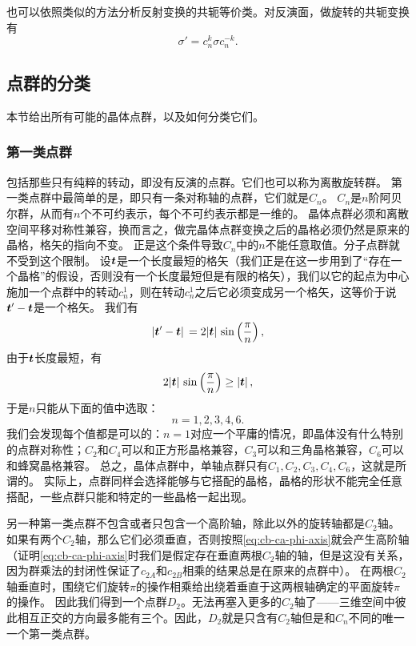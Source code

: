 也可以依照类似的方法分析反射变换的共轭等价类。对反演面，做旋转的共轭变换有
\begin{equation}
    \sigma' = c_n^k \sigma c_n^{-k}.
\end{equation}

\subsection{点群的分类}\label{sec:classification-point-groups}

本节给出所有可能的晶体点群，以及如何分类它们。

\subsubsection{第一类点群} 

包括那些只有纯粹的转动，即没有反演的点群。它们也可以称为离散旋转群。
第一类点群中最简单的是，即只有一条对称轴的点群，它们就是$C_n$。
$C_n$是$n$阶阿贝尔群，从而有$n$个不可约表示，每个不可约表示都是一维的。
晶体点群必须和离散空间平移对称性兼容，换而言之，做完晶体点群变换之后的晶格必须仍然是原来的晶格，格矢的指向不变。
正是这个条件导致$C_n$中的$n$不能任意取值。分子点群就不受到这个限制。
设$\vb*{t}$是一个长度最短的格矢（我们正是在这一步用到了“存在一个晶格”的假设，否则没有一个长度最短但是有限的格矢），我们以它的起点为中心施加一个点群中的转动$c_n^1$，则在转动$c_n^1$之后它必须变成另一个格矢，这等价于说$\vb*{t}' - \vb*{t}$是一个格矢。
我们有
\[
    \abs*{\vb*{t}' - \vb*{t}} = 2 \abs*{\vb*{t}} \sin\left(\frac{\pi}{n}\right),
\]
由于$\vb*{t}$长度最短，有
\[
    2 \abs*{\vb*{t}} \sin\left(\frac{\pi}{n}\right) \geq \abs*{\vb*{t}},
\]
于是$n$只能从下面的值中选取：
\[
    n = 1, 2, 3, 4, 6.
\]
我们会发现每个值都是可以的：$n=1$对应一个平庸的情况，即晶体没有什么特别的点群对称性；$C_2$和$C_4$可以和正方形晶格兼容，$C_3$可以和三角晶格兼容，$C_6$可以和蜂窝晶格兼容。
总之，晶体点群中，单轴点群只有$C_1, C_2, C_3, C_4, C_6$，这就是所谓的。
实际上，点群同样会选择能够与它搭配的晶格，晶格的形状不能完全任意搭配，一些点群只能和特定的一些晶格一起出现。

另一种第一类点群不包含或者只包含一个高阶轴，除此以外的旋转轴都是$C_2$轴。
如果有两个$C_2$轴，那么它们必须垂直，否则按照\eqref{eq:cb-ca-phi-axis}就会产生高阶轴（证明\eqref{eq:cb-ca-phi-axis}时我们是假定存在垂直两根$C_2$轴的轴，但是这没有关系，因为群乘法的封闭性保证了$c_{2A}$和$c_{2B}$相乘的结果总是在原来的点群中）。
在两根$C_2$轴垂直时，围绕它们旋转$\pi$的操作相乘给出绕着垂直于这两根轴确定的平面旋转$\pi$的操作。
因此我们得到一个点群$D_2$。无法再塞入更多的$C_2$轴了——三维空间中彼此相互正交的方向最多能有三个。因此，$D_2$就是只含有$C_2$轴但是和$C_n$不同的唯一一个第一类点群。

